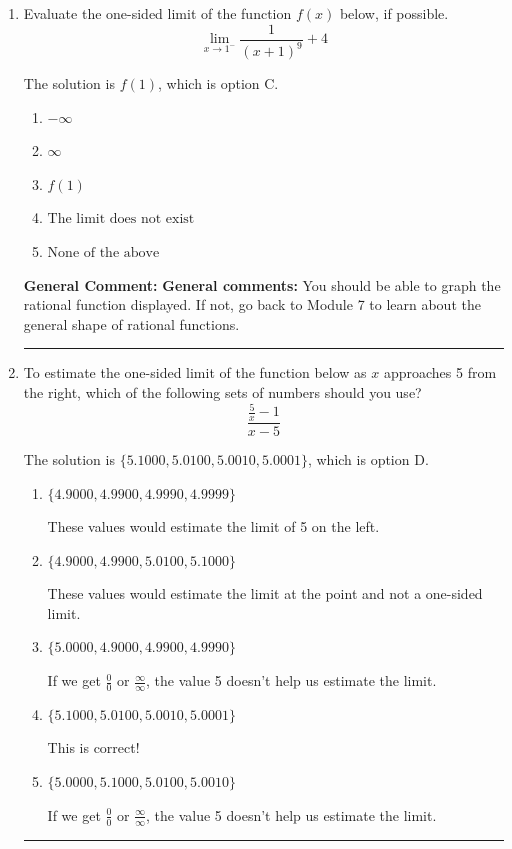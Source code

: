 \documentclass{extbook}[14pt]
\newcommand{\litem}[1]{\item #1

\rule{\textwidth}{0.4pt}}
\begin{document}
\begin{enumerate}\litem{
Evaluate the one-sided limit of the function $f(x)$ below, if possible.
\[ \lim_{x \rightarrow 1^-} \frac{1}{(x+1)^9}+4 \]

The solution is \( f(1) \), which is option C.\begin{enumerate}[label=\Alph*.]
\item \( -\infty \)


\item \( \infty \)


\item \( f(1) \)


\item \( \text{The limit does not exist} \)


\item \( \text{None of the above} \)


\end{enumerate}

\textbf{General Comment:} \textbf{General comments:} You should be able to graph the rational function displayed. If not, go back to Module 7 to learn about the general shape of rational functions.
}
\litem{
To estimate the one-sided limit of the function below as $x$ approaches 5 from the right, which of the following sets of numbers should you use?
\[ \frac{\frac{5}{x} - 1}{x - 5} \]

The solution is \( \{ 5.1000, 5.0100, 5.0010, 5.0001 \} \), which is option D.\begin{enumerate}[label=\Alph*.]
\item \( \{ 4.9000, 4.9900, 4.9990, 4.9999 \} \)

These values would estimate the limit of 5 on the left.
\item \( \{ 4.9000, 4.9900, 5.0100, 5.1000 \} \)

These values would estimate the limit at the point and not a one-sided limit.
\item \( \{ 5.0000, 4.9000, 4.9900, 4.9990 \} \)

If we get $\frac{0}{0}$ or $\frac{\infty}{\infty}$, the value 5 doesn't help us estimate the limit.
\item \( \{ 5.1000, 5.0100, 5.0010, 5.0001 \} \)

This is correct!
\item \( \{ 5.0000, 5.1000, 5.0100, 5.0010 \} \)

If we get $\frac{0}{0}$ or $\frac{\infty}{\infty}$, the value 5 doesn't help us estimate the limit.
\end{enumerate}

}
\end{enumerate}
\end{document}
